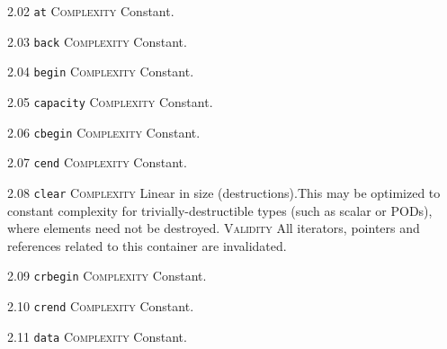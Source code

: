 \noindent\textcolor{cgreen}{2.02 \texttt{at}} \textsc{Complexity} Constant. \vspace{0.5em}

\noindent\textcolor{cgreen}{2.03 \texttt{back}} \textsc{Complexity} Constant. \vspace{0.5em}

\noindent\textcolor{cgreen}{2.04 \texttt{begin}} \textsc{Complexity} Constant. \vspace{0.5em}

\noindent\textcolor{cgreen}{2.05 \texttt{capacity}} \textsc{Complexity} Constant. \vspace{0.5em}

\noindent\textcolor{cgreen}{2.06 \texttt{cbegin}} \textsc{Complexity} Constant. \vspace{0.5em}

\noindent\textcolor{cgreen}{2.07 \texttt{cend}} \textsc{Complexity} Constant. \vspace{0.5em}

\noindent\textcolor{corange}{2.08 \texttt{clear}} \textsc{Complexity} Linear in size (destructions).This may be optimized to constant complexity for trivially-destructible types (such as scalar or PODs), where elements need not be destroyed. \textsc{Validity} All iterators, pointers and references related to this container are invalidated.\vspace{0.5em}

\noindent\textcolor{cgreen}{2.09 \texttt{crbegin}} \textsc{Complexity} Constant. \vspace{0.5em}

\noindent\textcolor{cgreen}{2.10 \texttt{crend}} \textsc{Complexity} Constant. \vspace{0.5em}

\noindent\textcolor{cgreen}{2.11 \texttt{data}} \textsc{Complexity} Constant. \vspace{0.5em}

